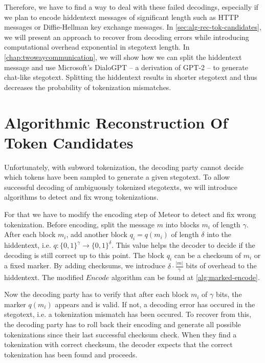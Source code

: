 Therefore, we have to find a way to deal with these failed decodings, especially if we plan to encode hiddentext messages of significant length such as HTTP messages or Diffie-Hellman key exchange messages.
In \autoref{sec:alg-rec-tok-candidates}, we will present an approach to recover from decoding errors while introducing computational overhead exponential in stegotext length. 
In \autoref{chap:twowaycommunication}, we will show how we can split the hiddentext message and use Microsoft's DialoGPT -- a derivation of GPT-2 -- to generate chat-like stegotext.
Splitting the hiddentext results in shorter stegotext and thus decreases the probability of tokenization mismatches.



\section{Algorithmic Reconstruction Of Token Candidates}
\label{sec:alg-rec-tok-candidates}

Unfortunately, with subword tokenization, the decoding party cannot decide which tokens have been sampled to generate a given stegotext.
To allow successful decoding of ambiguously tokenized stegotexts, we will introduce algorithms to detect and fix wrong tokenizations.


For that we have to modify the encoding step of Meteor to detect and fix wrong tokenization.
Before encoding, split the message $m$ into blocks $m_i$ of length $\gamma$. 
After each block $m_i$, add another block $q_i = q(m_i)$ of length $\delta$ into the hiddentext, i.e. $q \colon \{ 0,1 \}^\gamma \rightarrow \{ 0,1 \}^\delta$.
This value helps the decoder to decide if the decoding is still correct up to this point.
The block $q_i$ can be a checksum of $m_i$ or a fixed marker.
By adding checksums, we introduce $\delta \cdot \frac{|m|}{\gamma}$ bits of overhead to the hiddentext.
The modified $Encode$ algorithm can be found at \autoref{alg:marked-encode}.

Now the decoding party has to verify that after each block $m_i$ of $\gamma$ bits, the marker $q(m_i)$ appears and is valid.
If not, a decoding error has occured in the stegotext, i.e. a tokenization mismatch has been occured.
To recover from this, the decoding party has to roll back their encoding and generate all possible tokenizations since their last successful checksum check.
When they find a tokenization with correct checksum, the decoder expects that the correct tokenization has been found and proceeds.

